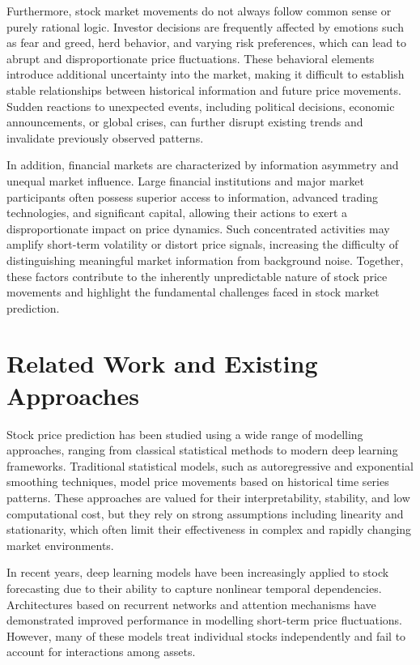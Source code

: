 Furthermore, stock market movements do not always follow common sense or purely rational logic. Investor decisions are frequently affected by emotions such as fear and greed, herd behavior, and varying risk preferences, which can lead to abrupt and disproportionate price fluctuations. These behavioral elements introduce additional uncertainty into the market, making it difficult to establish stable relationships between historical information and future price movements. Sudden reactions to unexpected events, including political decisions, economic announcements, or global crises, can further disrupt existing trends and invalidate previously observed patterns.

In addition, financial markets are characterized by information asymmetry and unequal market influence. Large financial institutions and major market participants often possess superior access to information, advanced trading technologies, and significant capital, allowing their actions to exert a disproportionate impact on price dynamics. Such concentrated activities may amplify short-term volatility or distort price signals, increasing the difficulty of distinguishing meaningful market information from background noise. Together, these factors contribute to the inherently unpredictable nature of stock price movements and highlight the fundamental challenges faced in stock market prediction.

\section{Related Work and Existing Approaches}

Stock price prediction has been studied using a wide range of modelling approaches, ranging from classical statistical methods to modern deep learning frameworks. Traditional statistical models, such as autoregressive and exponential smoothing techniques, model price movements based on historical time series patterns. These approaches are valued for their interpretability, stability, and low computational cost, but they rely on strong assumptions including linearity and stationarity, which often limit their effectiveness in complex and rapidly changing market environments.

In recent years, deep learning models have been increasingly applied to stock forecasting due to their ability to capture nonlinear temporal dependencies. Architectures based on recurrent networks and attention mechanisms have demonstrated improved performance in modelling short-term price fluctuations. However, many of these models treat individual stocks independently and fail to account for interactions among assets.

